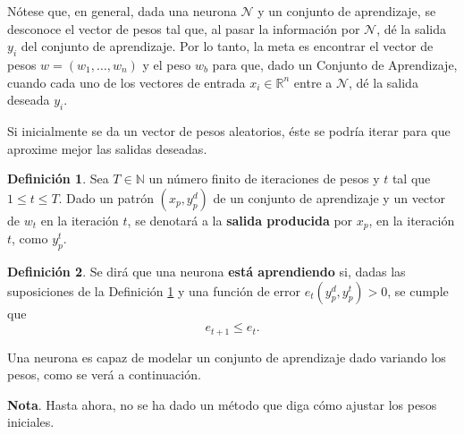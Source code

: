 \documentclass[11pt,letterpaper]{article}
\theoremstyle{definition}
\newtheorem{defi}{Definición}[section]%
\theoremstyle{definition}
\theoremstyle{definition}
\theoremstyle{definition}
\theoremstyle{definition}
\theoremstyle{definition}
\theoremstyle{definition}
\theoremstyle{definition}
\begin{document}
Nótese que, en general,  dada una neurona $ \mathcal{N} $ y un conjunto de aprendizaje, se desconoce el vector de pesos tal que, al pasar la información por $ \mathcal{N} $, dé la salida $ y_i $ del conjunto de aprendizaje. Por lo tanto, la meta es encontrar el vector de pesos $ w=(w_1, \dots, w_n) $ y el peso $ w_b $ para que, dado un Conjunto de Aprendizaje, cuando cada uno de los vectores de entrada $ x_i \in\mathbb{R}^n$ entre a $ \mathcal{N} $, dé la salida deseada $ y_i $. 

Si inicialmente se da un vector de pesos aleatorios, éste se podría iterar para que aproxime mejor las salidas deseadas.

\begin{defi}\label{defit}
	Sea $ T\in\mathbb{N} $ un número finito de iteraciones de pesos y $ t $ tal que  $ 1\leq t \leq T $. Dado un patrón $ (x_p,y_p^d) $ de un conjunto de aprendizaje y un vector de $ w_t $ en la iteración $ t $, se denotará a la \textbf{salida producida} por $ x_p $,  en la iteración $ t $, como $ y_p^t $.
\end{defi}

\begin{defi}
	Se dirá que una neurona \textbf{está aprendiendo} si, dadas las suposiciones de la Definición \ref{defit} y una función de error $ e_t(y_p^d, y_p^t )>0 $, se cumple que 
	\[ e_{t+1}\leq e_t . \]
	
	Una neurona es capaz de modelar un conjunto de aprendizaje dado variando los pesos, como se verá a continuación. 
	
	\textbf{Nota}. Hasta ahora, no se ha dado un método que diga cómo ajustar los pesos iniciales.
\end{defi}
\end{document}
